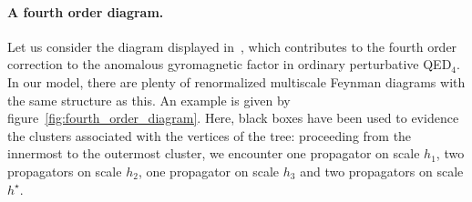 \documentclass[a4paper, 11pt]{article}
\theoremstyle{thm}
\begin{document}
\paragraph{A fourth order diagram.} Let us consider the diagram displayed in~\cite[Figure 1, row IV]{Karplus_Kroll_1950}, which contributes to the fourth order correction to the anomalous gyromagnetic factor in ordinary perturbative QED$_4$. In our model, there are plenty of renormalized multiscale Feynman diagrams with the same structure as this. An example is given by figure~\ref{fig:fourth_order_diagram}. Here, black boxes have been used to evidence the clusters associated with the vertices of the tree: proceeding from the innermost to the outermost cluster, we encounter one propagator on scale $h_1$, two propagators on scale $h_2$, one propagator on scale $h_3$ and two propagators on scale $h^\star$.
\end{document}
